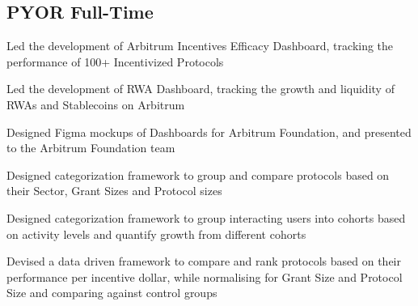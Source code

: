 
\subsection*{\color{UI_blue}PYOR \hfill Full-Time} 
    \begin{zitemize}
        \item Led the development of Arbitrum Incentives Efficacy Dashboard, tracking the performance of 100+ Incentivized Protocols
        \item Led the development of RWA Dashboard, tracking the growth and liquidity of RWAs and Stablecoins on Arbitrum
        \item Designed Figma mockups of Dashboards for Arbitrum Foundation, and presented to the Arbitrum Foundation team
        \item Designed categorization framework to group and compare protocols based on their Sector, Grant Sizes and Protocol sizes
        \item Designed categorization framework to group interacting users into cohorts based on activity levels and quantify growth from different cohorts
        \item Devised a data driven framework to compare and rank protocols based on their performance per incentive dollar, while normalising for Grant Size and Protocol Size and comparing against control groups
    \end{zitemize}
\vspace{0.4cm}
